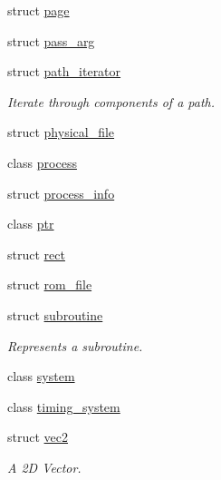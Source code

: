 \begin{DoxyCompactItemize}
\item 
struct \mbox{\hyperlink{structeka2l1_1_1page}{page}}
\item 
struct \mbox{\hyperlink{structeka2l1_1_1pass__arg}{pass\+\_\+arg}}
\item 
struct \mbox{\hyperlink{structeka2l1_1_1path__iterator}{path\+\_\+iterator}}
\begin{DoxyCompactList}\small\item\em Iterate through components of a path. \end{DoxyCompactList}\item 
struct \mbox{\hyperlink{structeka2l1_1_1physical__file}{physical\+\_\+file}}
\item 
class \mbox{\hyperlink{classeka2l1_1_1process}{process}}
\item 
struct \mbox{\hyperlink{structeka2l1_1_1process__info}{process\+\_\+info}}
\item 
class \mbox{\hyperlink{classeka2l1_1_1ptr}{ptr}}
\item 
struct \mbox{\hyperlink{structeka2l1_1_1rect}{rect}}
\item 
struct \mbox{\hyperlink{structeka2l1_1_1rom__file}{rom\+\_\+file}}
\item 
struct \mbox{\hyperlink{structeka2l1_1_1subroutine}{subroutine}}
\begin{DoxyCompactList}\small\item\em Represents a subroutine. \end{DoxyCompactList}\item 
class \mbox{\hyperlink{classeka2l1_1_1system}{system}}
\item 
class \mbox{\hyperlink{classeka2l1_1_1timing__system}{timing\+\_\+system}}
\item 
struct \mbox{\hyperlink{structeka2l1_1_1vec2}{vec2}}
\begin{DoxyCompactList}\small\item\em A 2D Vector. \end{DoxyCompactList}\end{DoxyCompactItemize}
